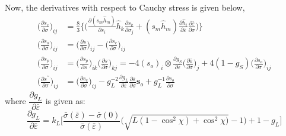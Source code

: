 \documentclass[12pt]{amsart}
\begin{document}
Now, the derivatives with respect to Cauchy stress is given below,
\begin{equation}
  \label{eq:dsp_dsig}
  \begin{split}
    \bigg(\frac{\partial s_c}{\partial \sigma}\bigg)_{ij}&=\frac{8}{3}\Bigg\{\bigg( \frac{\partial (s_m\hat{h}_m)}{\partial s_i}\hat{h}_k\frac{\partial s_k}{\partial\sigma_j} +(s_m\hat{h}_m) \frac{\partial \hat{h}_i}{\partial \bar{\varepsilon}}\frac{\partial\bar{\varepsilon}}{\partial\sigma} \bigg)  \Bigg\}\\
    \bigg(\frac{\partial s_o}{\partial \sigma}\bigg)_{ij}&=\bigg(\frac{\partial s}{\partial\sigma}\bigg)_{ij}-\bigg(\frac{\partial s_c}{\partial \sigma}\bigg)_{ij}\\
    \bigg(\frac{\partial s_p}{\partial \sigma}\bigg)_{ij}&=\bigg(\frac{\partial s_p}{\partial s}\bigg)_{ik} \bigg(\frac{\partial s}{\partial \sigma}\bigg)_{kj}= -4(s_o)_i\otimes\frac{\partial g_S}{\partial \bar{\varepsilon}}\bigg(\frac{\partial\bar{\varepsilon}}{\partial\sigma}\bigg)_j + 4(1-g_S) \bigg(\frac{\partial s_o}{\partial \sigma}\bigg)_{ij}\\
    \bigg(\frac{\partial s^{\prime\prime}}{\partial\sigma}\bigg)_{ij}&=\bigg(\frac{\partial s_c}{\partial\sigma}\bigg)_{ij}-g_L^{-2}\frac{\partial g_L}{\partial\bar{\varepsilon}}\frac{\partial\bar{\varepsilon}}{\partial \sigma}\mathbf{s}_o+g_L^{-1}\frac{\partial s_o}{\partial\sigma}
  \end{split}
\end{equation}
where $\dfrac{\partial g_L}{\partial\bar{\varepsilon}}$ is given as:
\begin{equation}
  \label{eq:dgl_de}
  \dfrac{\partial g_L}{\partial\bar{\varepsilon}}=k_L\bigg[\frac{\bar{\sigma}(\bar{\varepsilon})-\bar{\sigma}(0)}{\bar{\sigma}(\bar{\varepsilon})}
  \bigg(\sqrt{L(1-\cos^2\chi)+\cos^2\chi)}-1\bigg)+1-g_L\bigg]
\end{equation}
\newpage
\end{document}
